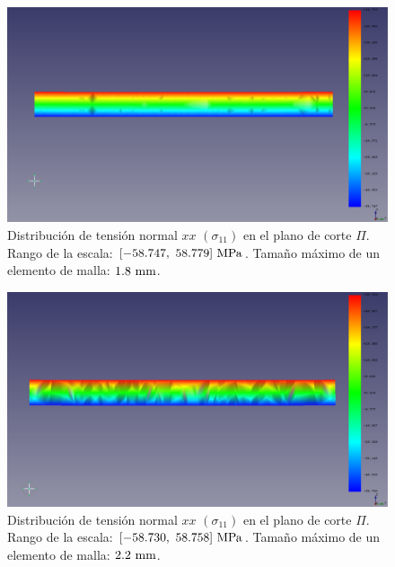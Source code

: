\begin{figure}[H]
    \centering
    \includegraphics[width=\textwidth]{figures/resultados/stress_vector_x_18.pdf}
    \caption{Distribución de tensión normal $xx$ $(\sigma_{11})$ en el plano de corte $\Pi$. Rango de la escala: $[-58.747, \ 58.779] \ \mega\pascal$. Tamaño máximo de un elemento de malla: $1.8 \ \milli\meter$.}
    \label{fig:stress_vector_x_18}
\end{figure}

\begin{figure}[H]
    \centering
    \includegraphics[width=\textwidth]{figures/resultados/stress_vector_x_22.pdf}
    \caption{Distribución de tensión normal $xx$ $(\sigma_{11})$ en el plano de corte $\Pi$. Rango de la escala: $[-58.730, \ 58.758] \ \mega\pascal$. Tamaño máximo de un elemento de malla: $2.2 \ \milli\meter$.}
    \label{fig:stress_vector_x_22}
\end{figure}

